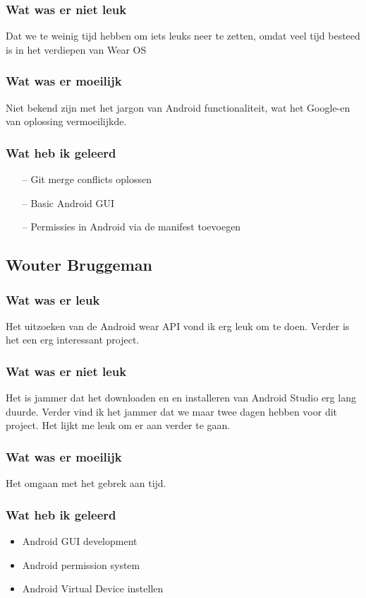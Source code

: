 \documentclass[../main.tex]{subfiles}
\begin{document}
\subsubsection{Wat was er niet leuk}
Dat we te weinig tijd hebben om iets leuks neer te zetten, omdat veel tijd besteed is in het verdiepen
van Wear OS
\subsubsection{Wat was er moeilijk}
Niet bekend zijn met het jargon van Android functionaliteit, wat het Google-en van oplossing
vermoeilijkde.
\subsubsection{Wat heb ik geleerd}
\begin{itemize}
	\item[--] Git merge conflicts oplossen
	\item[--] Basic Android GUI
	\item[--] Permissies in Android via de manifest toevoegen
\end{itemize}
\newpage

\subsection{Wouter Bruggeman}
\subsubsection{Wat was er leuk}
Het uitzoeken van de Android wear API vond ik erg leuk om te doen. Verder is het een erg
interessant project.
\subsubsection{Wat was er niet leuk}
Het is jammer dat het downloaden en en installeren van Android Studio erg lang duurde.
Verder vind ik het jammer dat we maar twee dagen hebben voor dit project. Het lijkt me leuk
om er aan verder te gaan.
\subsubsection{Wat was er moeilijk}
Het omgaan met het gebrek aan tijd.
\subsubsection{Wat heb ik geleerd}
\begin{itemize}
	\item Android GUI development
	\item Android permission system
	\item Android Virtual Device instellen
\end{itemize}
\newpage
\end{document}
